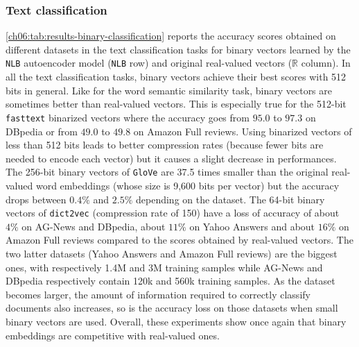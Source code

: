     \subsubsection{Text classification}
      \autoref{ch06:tab:results-binary-classification} reports the accuracy
      scores obtained on different datasets in the text classification tasks for
      binary vectors learned by the \texttt{NLB} autoencoder model (\texttt{NLB}
      row) and original real-valued vectors ($\mathbb{R}$ column). In all the
      text classification tasks, binary vectors achieve their best scores with
      512 bits in general. Like for the word semantic similarity task, binary
      vectors are sometimes better than real-valued vectors. This is especially
      true for the 512-bit \texttt{fasttext} binarized vectors where the
      accuracy goes from $95.0$ to $97.3$ on DBpedia or from $49.0$ to $49.8$ on
      Amazon Full reviews. Using binarized vectors of less than 512 bits leads
      to better compression rates (because fewer bits are needed to encode each
      vector) but it causes a slight decrease in performances. The 256-bit
      binary vectors of \texttt{GloVe} are 37.5 times smaller than the original
      real-valued word embeddings (whose size is 9,600 bits per vector) but the
      accuracy drops between $0.4\%$ and $2.5\%$ depending on the dataset. The
      64-bit binary vectors of \texttt{dict2vec} (compression rate of 150) have
      a loss of accuracy of about $4\%$ on AG-News and DBpedia, about $11\%$ on
      Yahoo Answers and about $16\%$ on Amazon Full reviews compared to the
      scores obtained by real-valued vectors. The two latter datasets (Yahoo
      Answers and Amazon Full reviews) are the biggest ones, with respectively
      1.4M and 3M training samples while AG-News and DBpedia respectively
      contain 120k and 560k training samples. As the dataset becomes larger, the
      amount of information required to correctly classify documents also
      increases, so is the accuracy loss on those datasets when small binary
      vectors are used. Overall, these experiments show once again that binary
      embeddings are competitive with real-valued ones.

